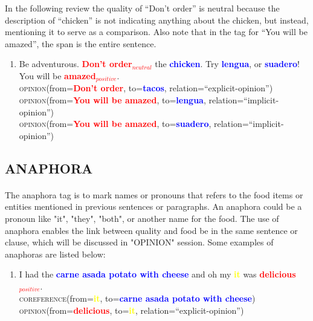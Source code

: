 \documentclass{article}
\begin{document}
In the following review the quality of ``Don't order'' is neutral because the description of ``chicken'' is not indicating anything about the chicken, but instead, mentioning it to serve as a comparison. Also note that in the tag for ``You will be amazed'', the span is the entire sentence. 

\begin{enumerate}[resume]
\item Be adventurous. \textbf{\textcolor{red}{Don't order$_{neutral}$}} the \textbf{\textcolor{blue}{chicken}}. Try \textbf{\textcolor{blue}{lengua}}, or \textbf{\textcolor{blue}{suadero}}! You will be \textbf{\textcolor{red}{amazed$_{positive}$}}.\\
	\textsc{opinion}(from=\textbf{\textcolor{red}{Don't order}}, to=\textbf{\textcolor{blue}{tacos}}, relation=``explicit-opinion'')\\
	\textsc{opinion}(from=\textbf{\textcolor{red}{You will be amazed}}, to=\textbf{\textcolor{blue}{lengua}}, relation=``implicit-opinion'')\\
	\textsc{opinion}(from=\textbf{\textcolor{red}{You will be amazed}}, to=\textbf{\textcolor{blue}{suadero}}, relation=``implicit-opinion'')
\end{enumerate}


\subsection{ANAPHORA}
\paragraph{}
The anaphora tag is to mark names or pronouns that refers to the food items or entities mentioned in previous sentences or paragraphs. An anaphora could be a pronoun like "it", "they", "both", or another name for the food. The use of anaphora enables the link between quality and food be in the same sentence or clause, which will be discussed in "OPINION" session. Some examples of anaphoras are listed below:

\begin{enumerate}[resume]
	\item I had the \textbf{\textcolor{blue}{carne asada potato with cheese}} and oh my \textbf{\textcolor{yellow}{it}} was \textbf{\textcolor{red}{delicious$_{positive}$}}.\\
	\textsc{coreference}(from=\textbf{\textcolor{yellow}{it}}, to=\textbf{\textcolor{blue}{carne asada potato with cheese}})\\
		\textsc{opinion}(from=\textbf{\textcolor{red}{delicious}}, to=\textbf{\textcolor{yellow}{it}}, relation=``explicit-opinion'')\\
\end{enumerate}
\end{document}
